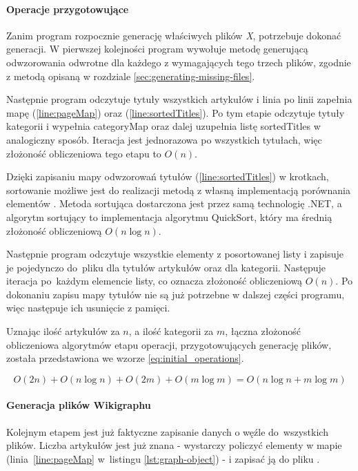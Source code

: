 \paragraph{Operacje przygotowujące}
Zanim program rozpocznie generację właściwych plików \textit{X}, potrzebuje dokonać generacji. W pierwszej kolejności program wywołuje metodę generującą odwzorowania odwrotne dla każdego z wymagających tego trzech plików, zgodnie z metodą opisaną w rozdziale \ref{sec:generating-missing-files}.

Następnie program odczytuje tytuły wszystkich artykułów i linia po linii zapełnia mapę  (\ref{line:pageMap}) oraz  (\ref{line:sortedTitles}). Po tym etapie odczytuje tytuły kategorii i wypełnia categoryMap oraz dalej uzupełnia listę sortedTitles w analogiczny sposób. Iteracja jest jednorazowa po wszystkich tytułach, więc złożoność obliczeniowa tego etapu to $O(n)$.

Dzięki zapisaniu mapy odwzorowań tytułów (\ref{line:sortedTitles}) w krotkach, sortowanie możliwe jest do realizacji metodą  z własną implementacją porównania elementów . Metoda sortująca dostarczona jest przez samą technologię .NET, a algorytm sortujący to implementacja algorytmu QuickSort, który ma średnią złożoność obliczeniową $O(n\log n)$.

Następnie program odczytuje wszystkie elementy z posortowanej listy i zapisuje je pojedynczo do~pliku  dla tytułów artykułów oraz  dla kategorii. Następuje iteracja po~każdym elemencie listy, co oznacza złożoność obliczeniową $O(n)$. Po dokonaniu zapisu mapy tytułów nie są już potrzebne w dalszej części programu, więc następuje ich usunięcie z pamięci.

Uznając ilość artykułów za $n$, a ilość kategorii za $m$, łączna złożoność obliczeniowa algorytmów etapu operacji, przygotowujących generację plików, została przedstawiona we wzorze \ref{eq:initial_operations}.

\begin{equation}
O(2n) + O(n\log n) + O(2m) + O(m \log m) = O(n\log n + m\log m)
\label{eq:initial_operations}
\end{equation}

\paragraph{Generacja plików Wikigraphu}
Kolejnym etapem jest już faktyczne zapisanie danych o węźle do~wszystkich plików. Liczba artykułów jest już znana - wystarczy policzyć elementy w mapie  (linia~\ref{line:pageMap} w~listingu \ref{lst:graph-object}) - i zapisać ją do pliku .


